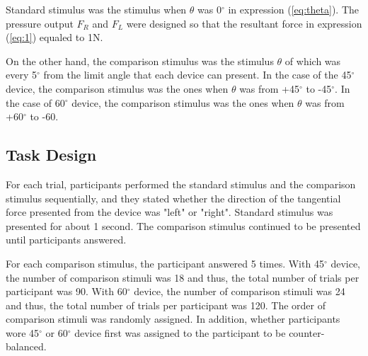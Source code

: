 Standard stimulus was the stimulus when $\theta$ was 0$^{\circ}$ in expression (\ref{eq:theta}). %
 The pressure output $F_{R}$ and $F_{L}$ were designed so that the resultant force in expression (\ref{eq:1}) equaled to 1N.

On the other hand, the comparison stimulus was the stimulus $\theta$ of which was every 5$^{\circ}$ from the limit angle that each device can present. 
In the case of the 45$^{\circ}$ device, the comparison stimulus was the ones when $\theta$ was from +45$^{\circ}$ to -45$^{\circ}$. 
In the case of 60$^{\circ}$ device, the comparison stimulus was the ones when $\theta$ was from +60$^{\circ}$ to -60.

\subsection{Task Design}

For each trial, participants performed
the standard stimulus and the comparison stimulus sequentially, and they stated whether the direction of the tangential force presented from the device was "left" or "right". %
Standard stimulus was presented for about 1 second.
The comparison stimulus continued to be presented until participants answered.

For each comparison stimulus, the participant answered 5 times. %
With 45$^{\circ}$ device, the number of comparison stimuli was 18 and thus, the total number of trials per participant was 90. 
With 60$^{\circ}$ device, the number of comparison stimuli was 24 and thus, the total number of trials per participant was 120. %
The order of comparison stimuli was randomly assigned.
In addition, whether participants wore 45$^{\circ}$ or 60$^{\circ}$ device first was assigned to the participant to be counter-balanced.

